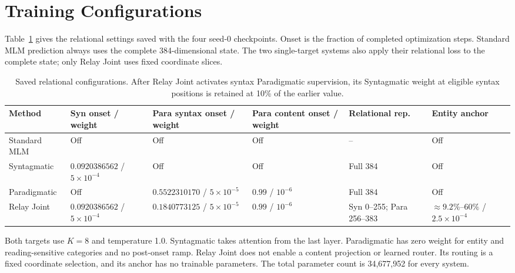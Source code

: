 \appendix

\section{Training Configurations}
\label{app:training-config}

Table~\ref{tab:primary-config} gives the relational settings saved
with the four seed-0 checkpoints. Onset is the fraction of completed
optimization steps. Standard MLM prediction always uses the complete
384-dimensional state. The two single-target systems also apply their
relational loss to the complete state; only Relay Joint uses fixed
coordinate slices.

\begin{table}[H]
\centering
\small
\setlength{\tabcolsep}{2pt}
\begin{tabular}{@{}p{}p{}p{}p{}p{}p{}@{}}
\toprule
Method & Syn onset / weight & Para syntax onset / weight & Para content onset / weight & Relational rep. & Entity anchor \\
\midrule
Standard MLM & Off & Off & Off & -- & Off \\
Syntagmatic & $0.0920386562$ / $5\!\times\!10^{-4}$ & Off & Off & Full 384 & Off \\
Paradigmatic & Off & $0.5522310170$ / $5\!\times\!10^{-5}$ & $0.99$ / $10^{-6}$ & Full 384 & Off \\
Relay Joint & $0.0920386562$ / $5\!\times\!10^{-4}$ & $0.1840773125$ / $5\!\times\!10^{-5}$ & $0.99$ / $10^{-6}$ & Syn 0--255; Para 256--383 & $\approx9.2\%$--$60\%$ / $2.5\!\times\!10^{-4}$ \\
\bottomrule
\end{tabular}
\caption{Saved relational configurations. After Relay Joint activates
syntax Paradigmatic supervision, its Syntagmatic weight at eligible
syntax positions is retained at 10\% of the earlier value.}
\label{tab:primary-config}
\end{table}

Both targets use $K=8$ and temperature 1.0. Syntagmatic takes
attention from the last layer. Paradigmatic has zero weight for entity
and reading-sensitive categories and no post-onset ramp. Relay Joint
does not enable a content projection or learned router. Its routing is
a fixed coordinate selection, and its anchor has no trainable
parameters. The total parameter count is 34,677,952 for every system.

